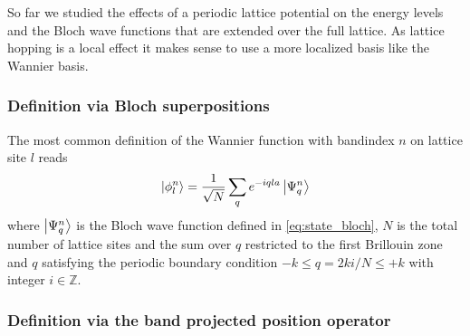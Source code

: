 So far we studied the effects of a periodic lattice potential on the energy
levels and the Bloch wave functions that are extended over the full lattice.
As lattice hopping is a local effect it makes sense to use a more localized
basis like the Wannier basis.

\subsubsection{Definition via Bloch superpositions}

The most common definition of the Wannier function with bandindex $n$ on
lattice site $l$ reads
\begin{equation}
  \ket{\phi^n_{l}}
  =\frac{1}{\sqrt{N}}\sum_qe^{-iqla}\ket{\Psi^n_{q}}
  \label{eq:state_wannier_orthodox}
\end{equation}
where $\ket{\Psi^n_q}$ is the Bloch wave function defined in
\cref{eq:state_bloch}, $N$ is the total number of lattice sites and the sum
over $q$ restricted to the first Brillouin zone and $q$ satisfying the
periodic boundary condition $-k\leq q=2ki/N\leq+k$ with integer
$i\in\mathbb{Z}$.

\subsubsection{Definition via the band projected position operator}


